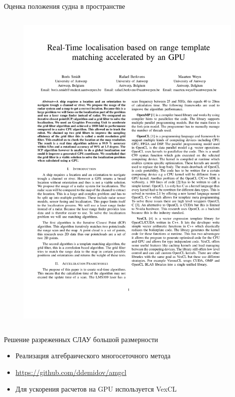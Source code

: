 \documentclass[@BEAMER_OPTIONS@]{beamer}
\newcommand{\www}[1]{\href{#1}{#1}}
\begin{document}
\begin{frame}{Оценка положения судна в пространстве}
\begin{columns}
\begin{column}{0.45\textwidth}
\begin{figure}
                \includegraphics[height=1.05\textheight]{smidt}
            \end{figure}
        \end{column}
    \end{columns}
\end{frame}

\begin{frame}{Решение разреженных СЛАУ большой размерности}
    \begin{itemize}
        \item Реализация алгебраического многосеточного метода
        \item \www{https://github.com/ddemidov/amgcl}
        \item Для ускорения расчетов на GPU используется VexCL
    \end{itemize}
\end{frame}
\end{document}
